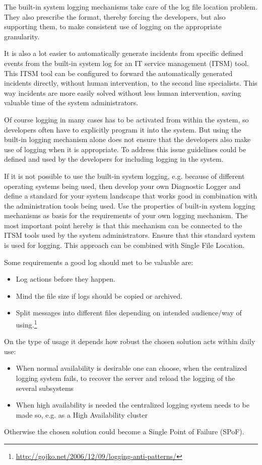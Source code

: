 The built-in system logging mechanisms take care of the log file location problem. They also prescribe the format, thereby forcing the developers, but also supporting them, to make consistent use of logging on the appropriate granularity.

It is also a lot easier to automatically generate incidents from specific defined events from the built-in system log for an IT service management (ITSM) tool. This ITSM tool can be configured to forward the automatically generated incidents directly, without human intervention, to the second line specialists. This way incidents are more easily solved without less human intervention, saving valuable time of the system administrators.

Of course logging in many cases has to be activated from within the system, so developers often have to explicitly program it into the system. But using the built-in logging mechanism alone does not ensure that the developers also make use of logging when it is appropriate. To address this issue guidelines could be defined and used by the developers for including logging in the system. 

If it is not possible to use the built-in system logging, e.g. because of different operating systems being used, then develop your own {\sc Diagnostic Logger} \cite{Harrison2011} and define a standard for your system landscape that works good in combination with the administration tools being used. Use the properties of built-in system logging mechanisms as basis for the requirements of your own logging mechanism. The most important point hereby is that this mechanism can be connected to the ITSM tools used by the system administrators. Ensure that this standard system is used for logging. This approach can be combined with {\sc Single File Location}.

Some requirements a good log should met to be valuable are:
\begin{itemize}
	\item Log actions before they happen.
	\item Mind the file size if logs should be copied or archived.
	\item Split messages into different files depending on intended audience/way of using.\footnote{\url{http://gojko.net/2006/12/09/logging-anti-patterns/}}
\end{itemize}

On the type of usage it depends how robust the chosen solution acts within daily use:
\begin{itemize}
	\item When normal availability is desirable one can choose, when the  centralized logging system fails, to recover the server and reload the logging of the several subsystems
	\item When high availability is needed the centralized logging system needs to be made so, e.g. as a High Availability cluster
\end{itemize}
Otherwise the chosen solution could become a Single Point of Failure (SPoF).


